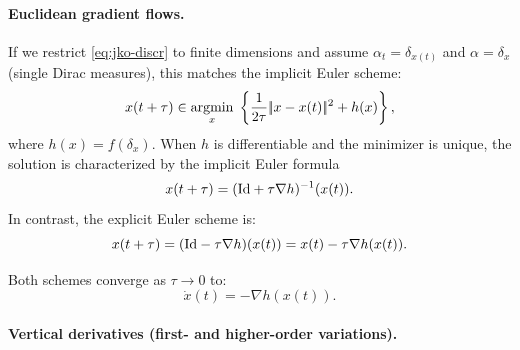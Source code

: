 \paragraph{Euclidean gradient flows.}

If we restrict \eqref{eq:jko-discr} to finite dimensions and assume $\alpha_t = \delta_{x(t)}$ and $\alpha = \delta_x$ (single Dirac measures), this matches the implicit Euler scheme:
\begin{equation*}
    x(t+\tau) \in \underset{x}{\operatorname{argmin}}\;\left\{\frac{1}{2 \tau} |\!| x - x(t) |\!|^2 + h(x)\right\},
\end{equation*}
where $h(x) = f(\delta_x)$. When $h$ is differentiable and the minimizer is unique, the solution is characterized by the implicit Euler formula
\begin{equation*}
    x(t+\tau) = (\mathrm{Id} + \tau \nabla h)^{-1}(x(t)).
\end{equation*}
In contrast, the explicit Euler scheme is:
\begin{equation*}
    x(t+\tau) = (\mathrm{Id} - \tau \nabla h)(x(t)) = x(t) - \tau \nabla h(x(t)).
\end{equation*}

Both schemes converge as $\tau \to 0$ to:
\begin{equation}
    \dot{x}(t) = -\nabla h(x(t)). \label{eq:grad-flow-classical}
\end{equation}


\paragraph{Vertical derivatives (first- and higher-order variations).}

